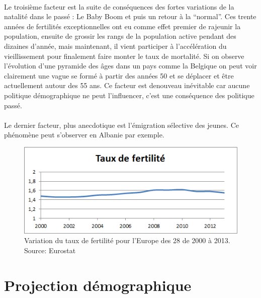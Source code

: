 \paragraph{}Le troisième facteur est la suite de conséquences des fortes variations de la natalité dans le passé\citep[pp.2]{heran} : Le Baby Boom et puis un retour à la “normal”. Ces trente années de fertilités exceptionnelles ont eu comme effet premier de rajeunir la population, ensuite de grossir les rangs de la population active pendant des dizaines d’année, mais maintenant, il vient participer à l’accélération du vieillissement pour finalement faire monter le taux de mortalité. Si on observe l’évolution d’une pyramide des âges dans un pays comme la Belgique on peut voir clairement une vague se formé à partir des années 50 et se déplacer et être actuellement autour des 55 ans\citep{pyramide-be}. Ce facteur est denouveau inévitable car aucune politique démographique ne peut l’influencer, c’est une conséquence des politique passé.

\paragraph{}Le dernier facteur\citep[pp.3]{heran}, plus anecdotique est l’émigration sélective des jeunes. Ce phénomène peut s’observer en Albanie par exemple.

\begin{figure}[h!]
    \begin{center}
        \includegraphics[scale=1]{document/fertilite_eu.png}
        \caption{Variation du taux de fertilité pour l'Europe des 28 de 2000 à 2013.  Source: Eurostat\citep{eurostat_fecondite}}
        \label{fertilite_eu}
    \end{center}
\end{figure}

\section{Projection démographique}
